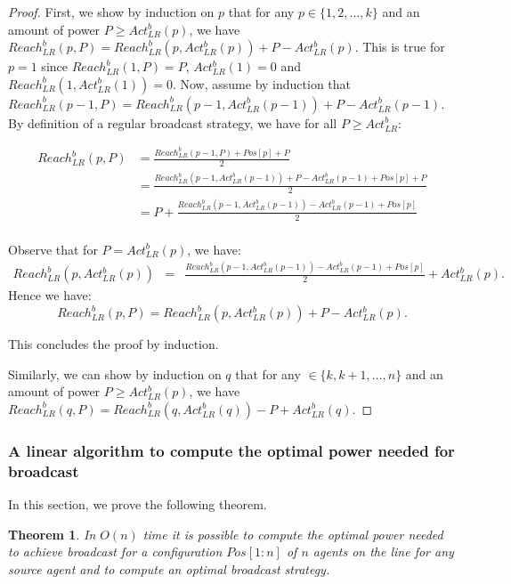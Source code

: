 \documentclass{article}
\newtheorem{theorem}{Theorem}
\newcommand\rblr{Reach_{LR}^b\xspace}
\newcommand\ablr{Act_{LR}^b\xspace}
\newcommand\broadcast{broadcast\xspace}
\begin{document}
\begin{proof}
First, we show by induction on $p$ that for any $p\in \{1,2,\hdots,k\}$ and an amount of power $P\ge \ablr(p)$, we have $\rblr(p,P) = \rblr(p,\ablr(p)) + P - \ablr(p).$
This is true for $p=1$ since $\rblr(1,P) = P$, $\ablr(1)=0$ and $\rblr(1,\ablr(1))=0$.
Now, assume by induction that $\rblr(p-1,P) = \rblr(p-1,\ablr(p-1)) + P - \ablr(p-1)$.
By definition of a regular broadcast strategy, we have for all $P\geq \ablr$:

\[
\begin{aligned}
\rblr(p,P)&=\frac{\rblr(p-1,P)+Pos[p]+P}{2}\\
&=\frac{\rblr(p-1,\ablr(p-1)) + P - \ablr(p-1)+Pos[p]+P}{2}\\
&=P+\frac{\rblr(p-1,\ablr(p-1)) - \ablr(p-1)+Pos[p]}{2}\\
\end{aligned}
\]

Observe that for $P=\ablr(p)$, we have: 
\begin{eqnarray*}
\rblr(p,\ablr(p)) & = &\frac{\rblr(p-1,\ablr(p-1))  - \ablr(p-1)+Pos[p]}{2} + \ablr(p).
\end{eqnarray*}
Hence we have:
$$\rblr(p,P)=  \rblr(p,\ablr(p)) + P - \ablr(p).$$

This concludes the proof by induction.

Similarly, we can show by induction on $q$ that for any $\in \{k,k+1,\hdots,n\}$ and an amount of power $P\ge \ablr(p)$, we have $\rblr(q,P) = \rblr(q,\ablr(q)) - P + \ablr(q).$
\end{proof}

\subsubsection{A linear algorithm to compute the optimal power needed for
  {\broadcast}}  

In this section, we prove the following theorem. 

\begin{theorem}\label{thm:OptPower-b}
In $O(n)$ time it is possible to compute the optimal power needed to achieve broadcast for a configuration $Pos[1 : n]$ of $n$ agents on the line for any source agent and to compute an optimal broadcast strategy.
\end{theorem}
\end{document}
